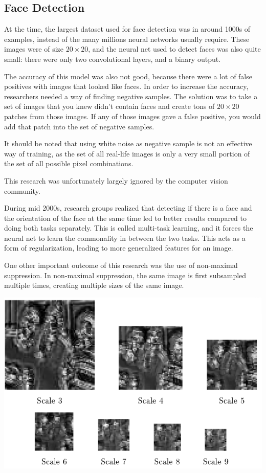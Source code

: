 \subsection{Face Detection}
At the time, the largest dataset used for face detection was in around 1000s of examples, instead of the many millions neural networks usually require.
These images were of size $20\times20$, and the neural net used to detect faces was also quite small: there were only two convolutional layers, and a binary output.

The accuracy of this model was also not good, because there were a lot of false positives with images that looked like faces.
In order to increase the accuracy, researchers needed a way of finding negative samples.
The solution was to take a set of images that you knew didn't contain faces and create tons of $20\times20$ patches from those images.
If any of those images gave a false positive, you would add that patch into the set of negative samples.

It should be noted that using white noise as negative sample is not an effective way of training, as the set of all real-life images is only a very small portion of the set of all possible pixel combinations.

This research was unfortunately largely ignored by the computer vision community.

During mid 2000s, research groups realized that detecting if there is a face and the orientation of the face at the same time led to better results compared to doing both tasks separately.
This is called multi-task learning, and it forces the neural net to learn the commonality in between the two tasks.
This acts as a form of regularization, leading to more generalized features for an image.

One other important outcome of this research was the use of non-maximal suppression.
In non-maximal suppression, the same image is first subsampled multiple times, creating multiple sizes of the same image.

\begin{center}
	\includegraphics[width=0.5\linewidth]{lectures/04-a/images/non-max-supp.png}
\end{center}

